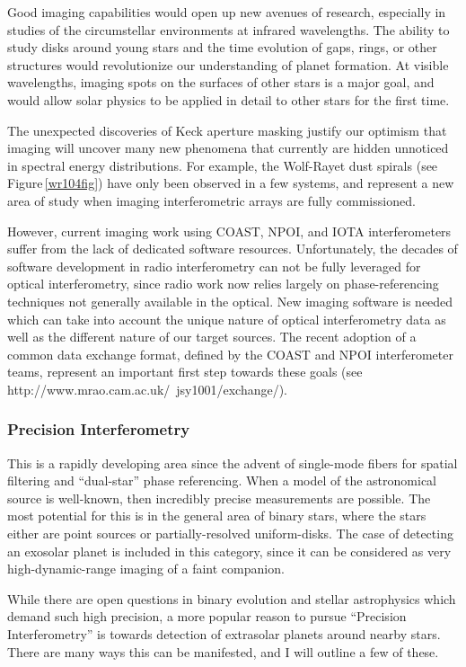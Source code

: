 \documentclass[12pt]{iopart}
\begin{document}
Good imaging capabilities would open up new avenues of research,
especially in studies of the circumstellar environments at infrared
wavelengths.  The ability to study disks around young stars and the
time evolution of gaps, rings, or other structures would revolutionize
our understanding of planet formation.  At visible wavelengths,
imaging spots on the surfaces of other stars is a major goal, and
would allow solar physics to be applied in detail to other stars for
the first time.

The unexpected discoveries of Keck aperture masking
justify our optimism that imaging will uncover many new phenomena that
currently are hidden unnoticed in spectral energy distributions.
For example, the Wolf-Rayet dust spirals (see
Figure\,\ref{wr104fig}) have only been observed in a few systems, and
represent a new area of study when imaging interferometric arrays are
fully commissioned.

However, current imaging work using COAST, NPOI, and IOTA
interferometers suffer from the lack of dedicated software resources.
Unfortunately, the decades of software development in radio
interferometry can not be fully leveraged for optical interferometry,
since radio work now relies largely on phase-referencing techniques
not generally available in the optical.  New imaging software is
needed which can take into account the unique nature of optical
interferometry data as well as the different nature of our target
sources.  The recent adoption of a common data exchange format,
defined by the COAST and NPOI interferometer teams, represent an
important first step towards these goals (see
http://www.mrao.cam.ac.uk/~jsy1001/exchange/).


\subsubsection{Precision Interferometry}
\label{precision}

This is a rapidly developing area since the advent of single-mode
fibers for spatial filtering and ``dual-star'' phase referencing.
When a model of the astronomical source is well-known, then incredibly
precise measurements are possible.  The most potential for this is in
the general area of binary stars, where the stars
either are point sources or partially-resolved uniform-disks.  The
case of detecting an exosolar planet is included in this category,
since it can be considered as very high-dynamic-range imaging of a
faint companion.

While there are open questions in binary evolution and stellar
astrophysics which demand such high precision, a more popular reason
to pursue ``Precision Interferometry'' is towards detection of
extrasolar planets around nearby stars.  There are many ways this can
be manifested, and I will outline a few of these.
\end{document}
